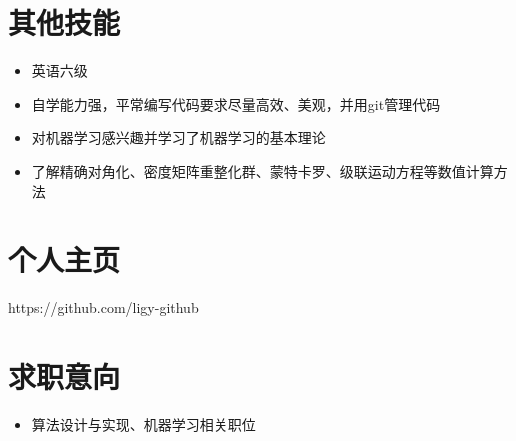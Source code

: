 \documentclass{resume}
\begin{document}
\section{其他技能}
\begin{itemize}%
\item 英语六级
\item 自学能力强，平常编写代码要求尽量高效、美观，并用git管理代码
\item 对机器学习感兴趣并学习了机器学习的基本理论
\item 了解精确对角化、密度矩阵重整化群、蒙特卡罗、级联运动方程等数值计算方法
\end{itemize}

\section{个人主页}
\rm{https://github.com/ligy-github}

\section{求职意向}
\begin{itemize}%
\item 算法设计与实现、机器学习相关职位
\end{itemize}

%  
\end{document}
